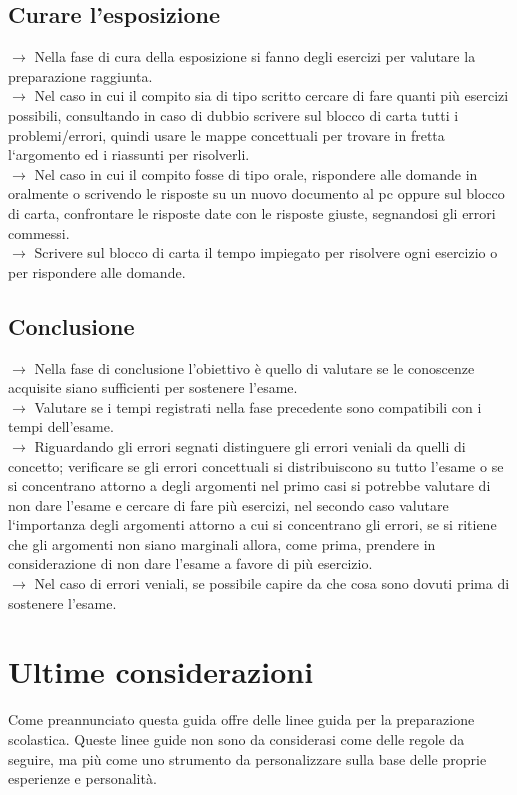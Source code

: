 \documentclass[11pt,a4paper]{article}
\begin{document}
\subsection{Curare l'esposizione}
$\rightarrow$ Nella fase di cura della esposizione si fanno degli esercizi per valutare la preparazione raggiunta.\\
$\rightarrow$ Nel caso in cui il compito sia di tipo scritto cercare di fare quanti più esercizi possibili, consultando in caso di dubbio scrivere sul blocco di carta tutti i problemi/errori, quindi usare le mappe concettuali per trovare in fretta l`argomento ed i riassunti per risolverli.\\
$\rightarrow$ Nel caso in cui il compito fosse di tipo orale, rispondere alle domande in oralmente o scrivendo le risposte su un nuovo documento al pc oppure sul blocco di carta,  confrontare le risposte date con le risposte giuste, segnandosi gli errori commessi.\\
$\rightarrow$ Scrivere sul blocco di carta il tempo impiegato per risolvere ogni esercizio o per rispondere alle domande.\\

\subsection{Conclusione}
$\rightarrow$ Nella fase di conclusione l'obiettivo è quello di valutare se le conoscenze acquisite siano sufficienti per sostenere l'esame. \\
$\rightarrow$ Valutare se i tempi registrati nella fase precedente sono compatibili con i tempi dell'esame.\\
$\rightarrow$ Riguardando gli errori segnati distinguere gli errori veniali da quelli di concetto; verificare se gli errori concettuali si distribuiscono su tutto l'esame o se si concentrano attorno a degli argomenti  nel primo casi si potrebbe valutare di non dare l'esame e cercare di fare più esercizi, nel secondo caso valutare l`importanza degli argomenti attorno a cui si concentrano gli errori, se si ritiene che gli argomenti non siano marginali allora, come prima, prendere in considerazione di non dare l'esame a favore di più esercizio.\\
$\rightarrow$ Nel caso di errori veniali, se possibile capire da che cosa sono dovuti prima di sostenere l'esame.\\

\section{Ultime considerazioni}
Come preannunciato questa guida offre delle linee guida per la preparazione scolastica. Queste linee guide non sono da considerasi come delle regole da seguire, ma più come uno strumento da personalizzare sulla base delle proprie esperienze e personalità. \\
	
\end{document}
